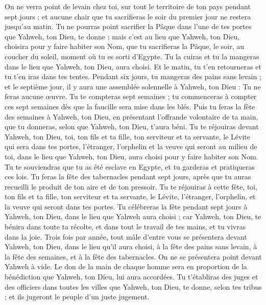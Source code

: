 \begin{multicols}{2}
On ne verra point de levain chez toi, sur tout le territoire de ton pays pendant sept jours ; et aucune chair que tu sacrifieras le soir du premier jour ne restera jusqu'au matin.
Tu ne pourras point sacrifier la Pâque dans l'une de tes portes que Yahweh, ton Dieu, te donne ;
mais c'est au lieu que Yahweh, ton Dieu, choisira pour y faire habiter son Nom, que tu sacrifieras la Pâque, le soir, au coucher du soleil, moment où tu es sorti d'Egypte.
Tu la cuiras et tu la mangeras dans le lieu que Yahweh, ton Dieu, aura choisi. Et le matin, tu t'en retourneras et tu t'en iras dans tes tentes.
Pendant six jours, tu mangeras des pains sans levain ; et le septième jour, il y aura une assemblée solennelle à Yahweh, ton Dieu : Tu ne feras aucune œuvre.
Tu te compteras sept semaines ; tu commenceras à compter ces sept semaines dès que la faucille sera mise dans les blés.
Puis tu feras la fête des semaines à Yahweh, ton Dieu, en présentant l'offrande volontaire de ta main, que tu donneras, selon que Yahweh, ton Dieu, t'aura béni.
Tu te réjouiras devant Yahweh, ton Dieu, toi, ton fils et ta fille, ton serviteur et ta servante, le Lévite qui sera dans tes portes, l'étranger, l'orphelin et la veuve qui seront au milieu de toi, dans le lieu que Yahweh, ton Dieu, aura choisi pour y faire habiter son Nom.
Tu te souviendras que tu as été esclave en Egypte, et tu garderas et pratiqueras ces lois.
Tu feras la fête des tabernacles pendant sept jours, après que tu auras recueilli le produit de ton aire et de ton pressoir.
Tu te réjouiras à cette fête, toi, ton fils et ta fille, ton serviteur et ta servante, le Lévite, l'étranger, l'orphelin, et la veuve qui seront dans tes portes.
Tu célébreras la fête pendant sept jours à Yahweh, ton Dieu, dans le lieu que Yahweh aura choisi ; car Yahweh, ton Dieu, te bénira dans toute ta récolte, et dans tout le travail de tes mains, et tu vivras dans la joie.
Trois fois par année, tout mâle d'entre vous se présentera devant Yahweh, ton Dieu, dans le lieu qu'il aura choisi, à la fête des pains sans levain, à la fête des semaines, et à la fête des tabernacles. On ne se présentera point devant Yahweh à vide.
Le don de la main de chaque homme sera en proportion de la bénédiction que Yahweh, ton Dieu, lui aura accordées.
Tu t'établiras des juges et des officiers dans toutes les villes que Yahweh, ton Dieu, te donne, selon tes tribus ; et ils jugeront le peuple d'un juste jugement.

\end{multicols}
